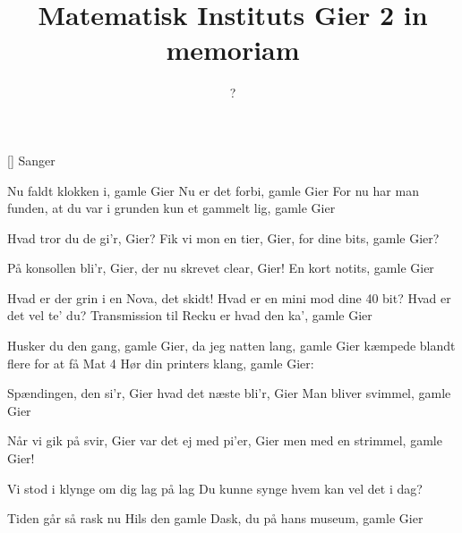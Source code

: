 \documentclass[a4paper,11pt]{article}
\title{Matematisk Instituts Gier 2 in memoriam}
\author{?}
\begin{document}
\maketitle

\begin{roles}
[] Sanger
\end{roles}

\begin{song}
  Nu faldt klokken i, gamle Gier
  Nu er det forbi, gamle Gier
  For nu har man funden,
  at du var i grunden
  kun et gammelt lig, gamle Gier

  Hvad tror du de gi'r, Gier?
  Fik vi mon en tier, Gier,
  for dine bits, gamle Gier?

  På konsollen bli'r, Gier,
  der nu skrevet clear, Gier!
  En kort notits, gamle Gier

  Hvad er der grin i
  \hspace{1cm}en Nova, det skidt!
  Hvad er en mini
  \hspace{1cm}mod dine 40 bit?
  Hvad er det vel te' du?
  Transmission til Recku
  er hvad den ka', gamle Gier

  Husker du den gang, gamle Gier,
  da jeg natten lang, gamle Gier
  kæmpede blandt flere
  for at få Mat 4
  Hør din printers klang, gamle Gier:

  Spændingen, den si'r, Gier
  hvad det næste bli'r, Gier
  Man bliver svimmel, gamle Gier

  Når vi gik på svir, Gier
  var det ej med pi'er, Gier
  men med en strimmel, gamle Gier!

  Vi stod i klynge
  \hspace{1cm}om dig lag på lag
  Du kunne synge
  \hspace{1cm}hvem kan vel det i dag?

  Tiden går så rask nu
  Hils den gamle Dask, du
  på hans museum, gamle Gier
\end{song}
\end{document}
